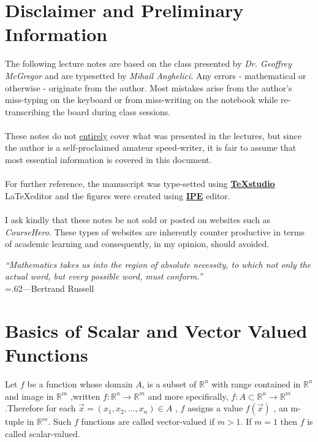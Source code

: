 \documentclass[
	12pt,
	]{article}
\newcommand{\Rn}{\mathbb{R}^{n}}
\newcommand{\R}{\mathbb{R}}
\newcommand{\Rm}{\mathbb{R}^{m}}
\newenvironment{changemargin}[2]{%
	\begin{list}{}{%
	\setlength{\topsep}{0pt}%
	\setlength{\leftmargin}{#1}%
	\setlength{\rightmargin}{#2}%
	\setlength{\listparindent}{\parindent}%
	\setlength{\itemindent}{\parindent}%
	\setlength{\parsep}{\parskip}%
	}%
	\item[]}{\end{list}}
\theoremstyle{custom}
\theoremstyle{custom}
\theoremstyle{custom}
\theoremstyle{custom}
\theoremstyle{custom}
\theoremstyle{definition}
\theoremstyle{example}
\theoremstyle{note}
\theoremstyle{remark}
\theoremstyle{example}
\numberwithin{equation}{subsection}
\begin{document}
	\section*{Disclaimer and Preliminary Information}
	\begin{changemargin}{1.6 cm}{1.6 cm}
	\noindent The following lecture notes are based on the class presented by \textit{Dr. Geoffrey McGregor} and are typesetted by \textit{Mihail Anghelici}. Any errors - mathematical or otherwise - originate from the author. Most mistakes arise from the author's miss-typing on the keyboard or from miss-writing on the notebook while re-transcribing the board during class sessions. \\ \\
		
		\noindent These notes do not \underline{entirely} cover what was presented in the lectures, but since the author is a self-proclaimed amateur speed-writer, it is fair to assume that most essential information is covered in this document.\\ \\
		
		\noindent For further reference, the manuscript was type-setted using \href{https://www.texstudio.org/}{\textbf{TeXstudio}} \LaTeX  editor and the figures were created using \href{http://ipe.otfried.org/}{\textbf{IPE}} editor.  \\ \\
		
		\noindent I ask kindly that these notes be not sold or posted on websites such as \textit{CourseHero}. These types of websites are inherently counter productive in terms of academic learning and consequently, in my opinion, should avoided.
		
		\vspace{6 cm}
		
		\begin{flushleft}
		\rightskip=1.8cm\textit{``Mathematics takes us into the region of absolute necessity, to which not only the actual word, but every possible word, must conform.''} \\
		\vspace{.2em}
		\leftskip=.62\linewidth---Bertrand Russell
		\end{flushleft}
		\vspace{1em}
	\end{changemargin}
	
	\newpage 
	\section{Basics of Scalar and Vector Valued Functions}
	Let $f$ be a function whose domain $ A $, is a subset of $ \mathbb{R}^{n} $ with range contained in $ \R^{n}$ and image in $\mathbb{R}^{m}$ ,written $ f: \Rn \to \Rm  $ and more specifically, $ f: A\subset \Rn \to \Rm  $ .Therefore for each $ \vec{x} = (x_{1}, x_{2} , \dots, x_{n})\in A $ , $ f $ assigns a value $ f(\vec{x}) $ , an m-tuple in $\Rm$. Such $f$ functions are called vector-valued if $m>1$. If $m=1$ then $f$ is called scalar-valued.
	
\end{document}

